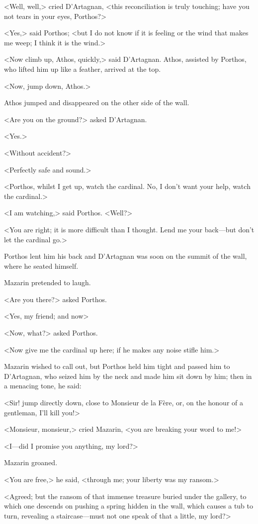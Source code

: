 <Well, well,> cried D'Artagnan, <this reconciliation is truly touching; have you not tears in your eyes, Porthos?>

<Yes,> said Porthos; <but I do not know if it is feeling or the wind that makes me weep; I think it is the wind.>

<Now climb up, Athos, quickly,> said D'Artagnan. Athos, assisted by Porthos, who lifted him up like a feather, arrived at the top.

<Now, jump down, Athos.>

Athos jumped and disappeared on the other side of the wall.

<Are you on the ground?> asked D'Artagnan.

<Yes.>

<Without accident?>

<Perfectly safe and sound.>

<Porthos, whilst I get up, watch the cardinal. No, I don't want your help, watch the cardinal.>

<I am watching,> said Porthos. <Well?>

<You are right; it is more difficult than I thought. Lend me your back—but don't let the cardinal go.>

Porthos lent him his back and D'Artagnan was soon on the summit of the wall, where he seated himself.

Mazarin pretended to laugh.

<Are you there?> asked Porthos.

<Yes, my friend; and now\longdash>

<Now, what?> asked Porthos.

<Now give me the cardinal up here; if he makes any noise stifle him.>

Mazarin wished to call out, but Porthos held him tight and passed him to D'Artagnan, who seized him by the neck and made him sit down by him; then in a menacing tone, he said:

<Sir! jump directly down, close to Monsieur de la Fère, or, on the honour of a gentleman, I'll kill you!>

<Monsieur, monsieur,> cried Mazarin, <you are breaking your word to me!>

<I—did I promise you anything, my lord?>

Mazarin groaned.

<You are free,> he said, <through me; your liberty was my ransom.>

<Agreed; but the ransom of that immense treasure buried under the gallery, to which one descends on pushing a spring hidden in the wall, which causes a tub to turn, revealing a staircase—must not one speak of that a little, my lord?>

